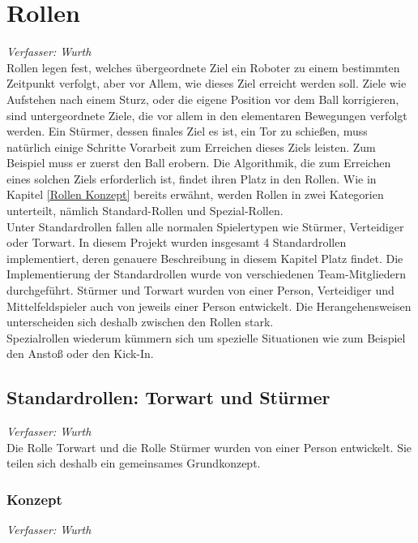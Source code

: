 \documentclass[fontsize=12pt,a4paper,final]{scrartcl}[2003/01/01]
\begin{document}
\section{Rollen}
\textit{Verfasser: Wurth}\\

Rollen legen fest, welches übergeordnete Ziel ein Roboter zu einem bestimmten Zeitpunkt verfolgt, aber vor Allem, wie dieses Ziel erreicht werden soll. Ziele wie Aufstehen nach einem Sturz, oder die eigene Position vor dem Ball korrigieren, sind untergeordnete Ziele, die vor allem in den elementaren Bewegungen verfolgt werden. Ein Stürmer, dessen finales Ziel es ist, ein Tor zu schießen, muss natürlich einige Schritte Vorarbeit zum Erreichen dieses Ziels leisten. Zum Beispiel muss er zuerst den Ball erobern. Die Algorithmik, die zum Erreichen eines solchen Ziels erforderlich ist, findet ihren Platz in den Rollen. Wie in Kapitel \ref{Rollen Konzept} bereits erwähnt, werden Rollen in zwei Kategorien unterteilt, nämlich Standard-Rollen und Spezial-Rollen.
\\

Unter Standardrollen fallen alle normalen Spielertypen wie Stürmer, Verteidiger oder Torwart. In diesem Projekt wurden insgesamt 4 Standardrollen implementiert, deren genauere Beschreibung in diesem Kapitel Platz findet. Die Implementierung der Standardrollen wurde von verschiedenen Team-Mitgliedern durchgeführt. Stürmer und Torwart wurden von einer Person, Verteidiger und Mittelfeldspieler auch von jeweils einer Person entwickelt. Die Herangehensweisen unterscheiden sich deshalb zwischen den Rollen stark.
\\

Spezialrollen wiederum kümmern sich um spezielle Situationen wie zum Beispiel den Anstoß oder den Kick-In.


\subsection{Standardrollen: Torwart und Stürmer}
\textit{Verfasser: Wurth}\\

Die Rolle Torwart und die Rolle Stürmer wurden von einer Person entwickelt. Sie teilen sich deshalb ein gemeinsames Grundkonzept.

\subsubsection{Konzept}
\textit{Verfasser: Wurth}\\
\end{document}
